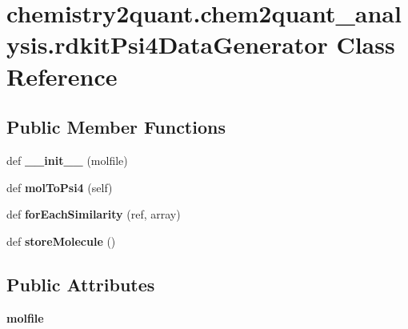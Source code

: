 \hypertarget{classchemistry2quant_1_1chem2quant__analysis_1_1rdkitPsi4DataGenerator}{}\section{chemistry2quant.\+chem2quant\+\_\+analysis.\+rdkit\+Psi4\+Data\+Generator Class Reference}
\label{classchemistry2quant_1_1chem2quant__analysis_1_1rdkitPsi4DataGenerator}
\subsection*{Public Member Functions}
\begin{DoxyCompactItemize}
\item 
\mbox{\label{classchemistry2quant_1_1chem2quant__analysis_1_1rdkitPsi4DataGenerator_a811506f84f82f5e8609e69c6b10e2bf7}} 
def {\bfseries \+\_\+\+\_\+init\+\_\+\+\_\+} (molfile)
\item 
\mbox{\label{classchemistry2quant_1_1chem2quant__analysis_1_1rdkitPsi4DataGenerator_a80e36c5df2435112fc52aadf846b8ea5}} 
def {\bfseries mol\+To\+Psi4} (self)
\item 
\mbox{\label{classchemistry2quant_1_1chem2quant__analysis_1_1rdkitPsi4DataGenerator_ad37d3b84849b3f07d5631b8d42e7af3c}} 
def {\bfseries for\+Each\+Similarity} (ref, array)
\item 
\mbox{\label{classchemistry2quant_1_1chem2quant__analysis_1_1rdkitPsi4DataGenerator_ad8854a42bbaffbc9a87f55d12a84961a}} 
def {\bfseries store\+Molecule} ()
\end{DoxyCompactItemize}
\subsection*{Public Attributes}
\begin{DoxyCompactItemize}
\item 
\mbox{\label{classchemistry2quant_1_1chem2quant__analysis_1_1rdkitPsi4DataGenerator_a1606dfd53ac0b1197eed92236e7c91b9}} 
{\bfseries molfile}
\end{DoxyCompactItemize}


